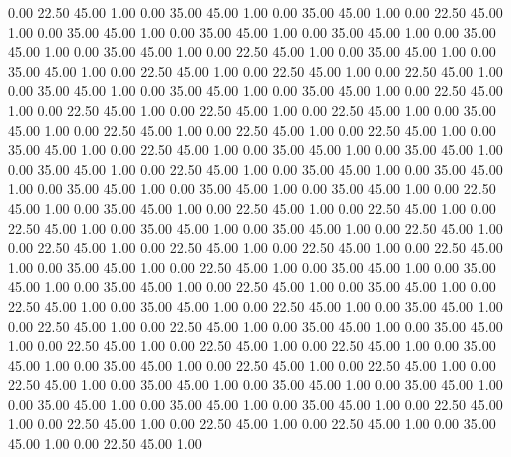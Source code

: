    0.00   22.50   45.00   1.00
   0.00   35.00   45.00   1.00
   0.00   35.00   45.00   1.00
   0.00   22.50   45.00   1.00
   0.00   35.00   45.00   1.00
   0.00   35.00   45.00   1.00
   0.00   35.00   45.00   1.00
   0.00   35.00   45.00   1.00
   0.00   35.00   45.00   1.00
   0.00   22.50   45.00   1.00
   0.00   35.00   45.00   1.00
   0.00   35.00   45.00   1.00
   0.00   22.50   45.00   1.00
   0.00   22.50   45.00   1.00
   0.00   22.50   45.00   1.00
   0.00   35.00   45.00   1.00
   0.00   35.00   45.00   1.00
   0.00   35.00   45.00   1.00
   0.00   22.50   45.00   1.00
   0.00   22.50   45.00   1.00
   0.00   22.50   45.00   1.00
   0.00   22.50   45.00   1.00
   0.00   35.00   45.00   1.00
   0.00   22.50   45.00   1.00
   0.00   22.50   45.00   1.00
   0.00   22.50   45.00   1.00
   0.00   35.00   45.00   1.00
   0.00   22.50   45.00   1.00
   0.00   35.00   45.00   1.00
   0.00   35.00   45.00   1.00
   0.00   35.00   45.00   1.00
   0.00   22.50   45.00   1.00
   0.00   35.00   45.00   1.00
   0.00   35.00   45.00   1.00
   0.00   35.00   45.00   1.00
   0.00   35.00   45.00   1.00
   0.00   35.00   45.00   1.00
   0.00   22.50   45.00   1.00
   0.00   35.00   45.00   1.00
   0.00   22.50   45.00   1.00
   0.00   22.50   45.00   1.00
   0.00   22.50   45.00   1.00
   0.00   35.00   45.00   1.00
   0.00   35.00   45.00   1.00
   0.00   22.50   45.00   1.00
   0.00   22.50   45.00   1.00
   0.00   22.50   45.00   1.00
   0.00   22.50   45.00   1.00
   0.00   22.50   45.00   1.00
   0.00   35.00   45.00   1.00
   0.00   22.50   45.00   1.00
   0.00   35.00   45.00   1.00
   0.00   35.00   45.00   1.00
   0.00   35.00   45.00   1.00
   0.00   22.50   45.00   1.00
   0.00   35.00   45.00   1.00
   0.00   22.50   45.00   1.00
   0.00   35.00   45.00   1.00
   0.00   22.50   45.00   1.00
   0.00   35.00   45.00   1.00
   0.00   22.50   45.00   1.00
   0.00   22.50   45.00   1.00
   0.00   35.00   45.00   1.00
   0.00   35.00   45.00   1.00
   0.00   22.50   45.00   1.00
   0.00   22.50   45.00   1.00
   0.00   22.50   45.00   1.00
   0.00   35.00   45.00   1.00
   0.00   35.00   45.00   1.00
   0.00   22.50   45.00   1.00
   0.00   22.50   45.00   1.00
   0.00   22.50   45.00   1.00
   0.00   35.00   45.00   1.00
   0.00   35.00   45.00   1.00
   0.00   35.00   45.00   1.00
   0.00   35.00   45.00   1.00
   0.00   35.00   45.00   1.00
   0.00   35.00   45.00   1.00
   0.00   22.50   45.00   1.00
   0.00   22.50   45.00   1.00
   0.00   22.50   45.00   1.00
   0.00   22.50   45.00   1.00
   0.00   35.00   45.00   1.00
   0.00   22.50   45.00   1.00
